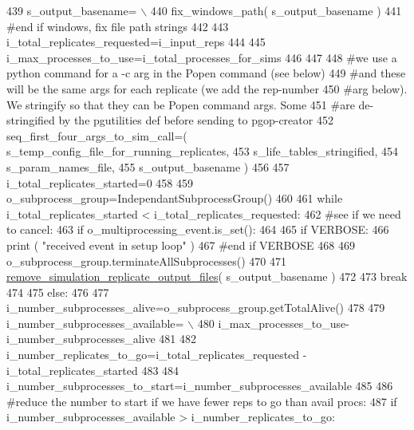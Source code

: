 \begin{DoxyCode}
439         s\_output\_basename= \(\backslash\)
440             fix\_windows\_path( s\_output\_basename )   
441     \textcolor{comment}{#end if windows, fix file path strings}
442 
443     i\_total\_replicates\_requested=i\_input\_reps
444 
445     i\_max\_processes\_to\_use=i\_total\_processes\_for\_sims
446 
447 
448     \textcolor{comment}{#we use a python command for a -c arg in the Popen command (see below)}
449     \textcolor{comment}{#and these will be the same args for each replicate (we add the rep-number}
450     \textcolor{comment}{#arg below).  We stringify so that they can be Popen command args.  Some}
451     \textcolor{comment}{#are de-stringified by the pgutilities def before sending to pgop-creator}
452     seq\_first\_four\_args\_to\_sim\_call=( s\_temp\_config\_file\_for\_running\_replicates,
453                                     s\_life\_tables\_stringified,
454                                     s\_param\_names\_file,
455                                     s\_output\_basename )
456     
457     i\_total\_replicates\_started=0
458 
459     o\_subprocess\_group=IndependantSubprocessGroup()
460 
461     \textcolor{keywordflow}{while} i\_total\_replicates\_started < i\_total\_replicates\_requested:
462         \textcolor{comment}{#see if we need to cancel:  }
463         \textcolor{keywordflow}{if} o\_multiprocessing\_event.is\_set():
464 
465             \textcolor{keywordflow}{if} VERBOSE:
466                 \textcolor{keywordflow}{print} ( \textcolor{stringliteral}{"received event in setup loop"} )
467             \textcolor{comment}{#end if VERBOSE}
468 
469             o\_subprocess\_group.terminateAllSubprocesses()
470             
471             \hyperlink{namespacenegui_1_1pgutilities_aa37c7d125e4eaec2eeea639f53fa140d}{remove\_simulation\_replicate\_output\_files}( 
      s\_output\_basename )
472 
473             \textcolor{keywordflow}{break}
474 
475         \textcolor{keywordflow}{else}:
476 
477             i\_number\_subprocesses\_alive=o\_subprocess\_group.getTotalAlive()
478 
479             i\_number\_subprocesses\_available= \(\backslash\)
480                     i\_max\_processes\_to\_use-i\_number\_subprocesses\_alive
481 
482             i\_number\_replicates\_to\_go=i\_total\_replicates\_requested - i\_total\_replicates\_started
483 
484             i\_number\_subprocesses\_to\_start=i\_number\_subprocesses\_available
485 
486             \textcolor{comment}{#reduce the number to start if we have fewer reps to go than avail procs:}
487             \textcolor{keywordflow}{if} i\_number\_subprocesses\_available > i\_number\_replicates\_to\_go:

\end{DoxyCode}
